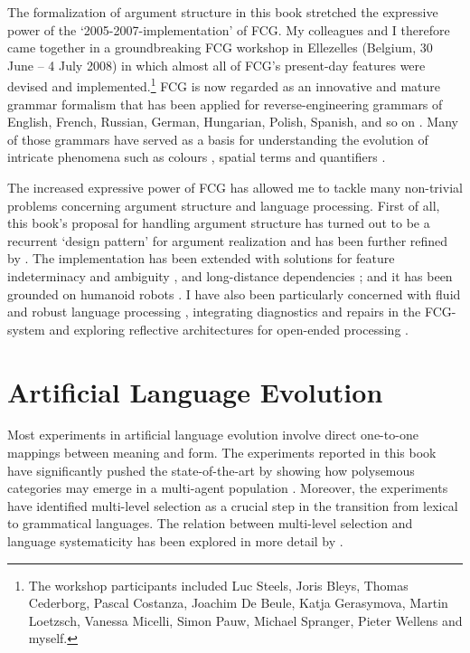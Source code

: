The formalization of argument structure in this book stretched the expressive power of the `2005-2007-implementation' of FCG. My colleagues and I therefore came together in a groundbreaking FCG workshop in Ellezelles (Belgium, 30 June -- 4 July 2008) in which almost all of FCG's present-day features were devised and implemented.\footnote{The workshop participants included Luc Steels, Joris Bleys, Thomas Cederborg, Pascal Costanza, Joachim De Beule, Katja Gerasymova, Martin Loetzsch, Vanessa Micelli, Simon Pauw, Michael Spranger, Pieter Wellens and myself.} FCG is now regarded as an innovative and mature grammar formalism \citep{vantrijp13comparison} that has been applied for reverse-engineering grammars of English, French, Russian, German, Hungarian, Polish, Spanish, and so on \citep{steels11design,steels12computational,steels12language}. Many of those grammars have served as a basis for understanding the evolution of intricate phenomena such as colours \citep{bleys10}, spatial terms \citep{spranger:11b} and quantifiers \citep{pauw13}.

The increased expressive power of FCG has allowed me to tackle many non-trivial problems concerning argument structure and language processing. First of all, this book's proposal for handling argument structure has turned out to be a recurrent `design pattern' for argument realization and has been further refined by \citet{vantrijp11design}. The implementation has been extended with solutions for feature indeterminacy and ambiguity \citep{vantrijp11feature}, and long-distance dependencies \citep{vantrijp14}; and it has been grounded on humanoid robots \citep{steels12action}. I have also been particularly concerned with fluid and robust language processing \citep{steels11how}, integrating diagnostics and repairs in the FCG-system \citep{beuls12diagnostics} and exploring reflective architectures for open-ended processing \citep{vantrijp12robust}.

\section*{Artificial Language Evolution}

Most experiments in artificial language evolution involve direct one-to-one mappings between meaning and form. The experiments reported in this book have significantly pushed the state-of-the-art by showing how polysemous categories may emerge in a multi-agent population \citep[for more recent results, see][]{vantrijp10grammaticalization,vantrijp:11a,vantrijp12b,vantrijp12case}. Moreover, the experiments have identified multi-level selection as a crucial step in the transition from lexical to grammatical languages. The relation between multi-level selection and language systematicity has been explored in more detail by \citet{vantrijp:12f}.

